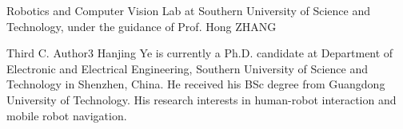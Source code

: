 Robotics and Computer Vision Lab at Southern University of Science and Technology, under the guidance of Prof. Hong ZHANG

\begin{IEEEbiography}
{Third C. Author3} Hanjing Ye is currently a Ph.D. candidate at Department of Electronic and Electrical Engineering, Southern University of Science and Technology in Shenzhen, China. He received his BSc degree from Guangdong University of Technology. His research interests in human-robot interaction and mobile robot navigation.


\end{IEEEbiography}